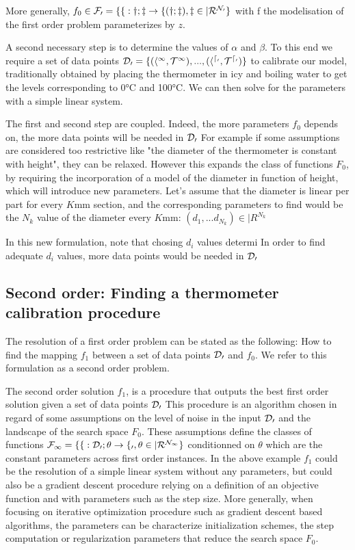 \begin{bibunit}
{{{{{{  More generally, $f_0 \in \cal{F}_0 = \{ f: y; z \to f(y; z), z \in |R^{N_0} \}$ with f the modelisation of the first order problem parameterizes by $z$.

  A second necessary step is to determine the values of $\alpha$ and $\beta$. To this end we require a set of data points $\cal{D}_0 = \{(h^1, T^1), ..., (h^{d_0}, T^{d_0})\}$ to calibrate our model, traditionally obtained by placing the thermometer in icy and boiling water to get the levels corresponding to 0°C and 100°C. We can then solve for the parameters with a simple linear system.


  The first and second step are coupled. Indeed, the more parameters $f_0$ depends on, the more data points will be needed in $\cal{D}_0$
  For example if some assumptions are considered too restrictive like "the diameter of the thermometer is constant with height", they can be relaxed.
  However this expands the class of functions $F_0$, by requiring the incorporation of a model of the diameter in function of height, which will introduce new parameters. Let's assume that the diameter is linear per part for every $K$mm section, and the corresponding parameters to find would be the $N_k$ value of the diameter every $K$mm: $(d_1, ... d_{N_k}) \in |R^{N_k}$ 

  In this new formulation, note that chosing $d_i$ values determi
  In order to find adequate $d_i$ values, more data points would be needed in $\cal{D}_0$

\subsection{Second order: Finding a thermometer calibration procedure}
  The resolution of a first order problem can be stated as the following: How to find the mapping $f_1$ between a set of data points $\cal{D}_0$ and $f_0$.
  We refer to this formulation as a second order problem.

  The second order solution $f_1$, is a procedure that outputs the best first order solution given a set of data points $\cal{D}_0$
  This procedure is an algorithm chosen in regard of some assumptions on the level of noise in the input $\cal{D}_0$ and the landscape of the search space $F_0$. These assumptions define the classes of functions $\cal{F}_1 = \{f: \cal{D}_0; \theta \to f_0, \theta \in |R^{N_1}\}$ conditionned on $\theta$ which are the constant parameters across first order instances.
  In the above example $f_1$ could be the resolution of a simple linear system without any parameters, but could also be a gradient descent procedure relying on a definition of an objective function and with parameters such as the step size. 
  More generally, when focusing on iterative optimization procedure such as gradient descent based algorithms, the parameters \theta can be characterize initialization schemes, the step computation or regularization parameters that reduce the search space $F_0$.


}}}}}}
\end{bibunit}
